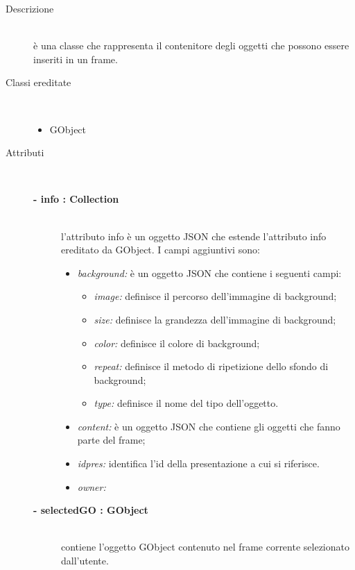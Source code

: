 \begin{description}
\item[Descrizione] \hfill \\
	è una classe che rappresenta il contenitore degli oggetti che possono essere inseriti in un frame.
	
	\item[Classi ereditate] \hfill \\
	\begin{itemize}
		\item GObject
	\end{itemize}
	
\item[Attributi] \hfill \\
	\begin{description}
		\item[\textbf{- info : Collection			}] \hfill \\
			l'attributo info è un oggetto JSON che estende l'attributo info ereditato da GObject. I campi aggiuntivi sono:
	\begin{itemize}
		\item \textit{background:} è un oggetto JSON che contiene i seguenti campi:
		\begin{itemize}
			\item \textit{image:} definisce il percorso dell'immagine di background;
			\item \textit{size:} definisce la grandezza dell'immagine di background;
			\item \textit{color:} definisce il colore di background;
			\item \textit{repeat:} definisce il metodo di ripetizione dello sfondo di background;
			\item \textit{type:} definisce il nome del tipo dell'oggetto.
		\end{itemize}		
		\item \textit{content:} è un oggetto JSON che contiene gli oggetti che fanno parte del frame;
		\item \textit{idpres:} identifica l'id della presentazione a cui si riferisce.
		\item \textit{owner:} %
	\end{itemize}
	\end{description}
	\begin{description}
		\item[\textbf{- selectedGO : GObject			}] \hfill \\
			contiene l'oggetto GObject contenuto nel frame corrente selezionato dall'utente.  
	\end{description}
	

\end{description}
